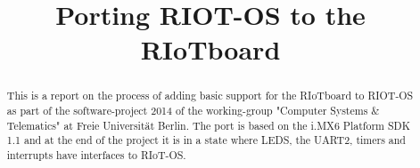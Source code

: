 \documentclass[conference,a4paper]{IEEEtran}
\begin{document}
\title{Porting RIOT-OS to the RIoTboard}

\author{
}

\maketitle

\begin{abstract}
This is a report on the process of adding basic support for the RIoTboard to RIOT-OS as
part of the software-project 2014 of the working-group "Computer Systems \& Telematics"
at Freie Universität Berlin.
The port is based on the i.MX6 Platform SDK 1.1 and at the end of the project it is in a
state where LEDS, the UART2, timers and interrupts have interfaces to RIoT-OS.
\end{abstract}

\IEEEpeerreviewmaketitle











%
%
\end{document}
